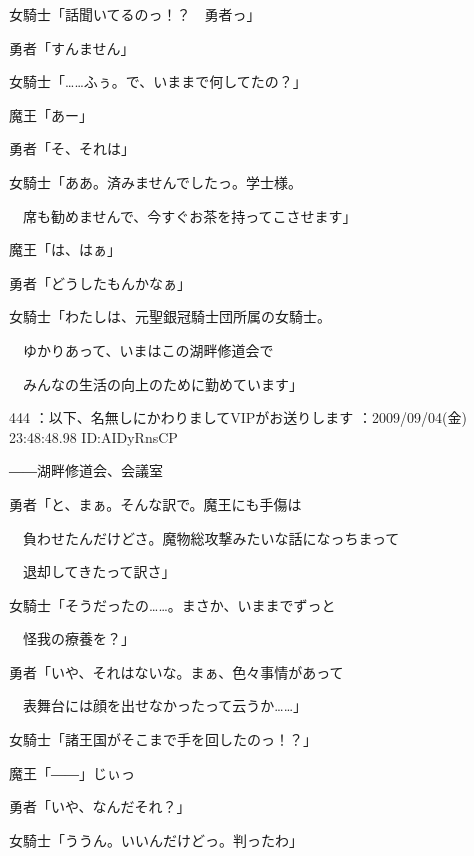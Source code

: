 \documentclass[a4j,twocolumn]{tarticle}
\begin{document}
女騎士「話聞いてるのっ！？　勇者っ」 



勇者「すんません」 



女騎士「……ふぅ。で、いままで何してたの？」 



魔王「あー」\par{} 
勇者「そ、それは」 



女騎士「ああ。済みませんでしたっ。学士様。\par{} 
　席も勧めませんで、今すぐお茶を持ってこさせます」 



魔王「は、はぁ」\par{} 
勇者「どうしたもんかなぁ」 



女騎士「わたしは、元聖銀冠騎士団所属の女騎士。\par{} 
　ゆかりあって、いまはこの湖畔修道会で\par{} 
　みんなの生活の向上のために勤めています」 

	
    
    

444 ：以下、名無しにかわりましてVIPがお送りします ：2009/09/04(金) 23:48:48.98 ID:AIDyRnsCP 


――湖畔修道会、会議室 



勇者「と、まぁ。そんな訳で。魔王にも手傷は\par{} 
　負わせたんだけどさ。魔物総攻撃みたいな話になっちまって\par{} 
　退却してきたって訳さ」 



女騎士「そうだったの……。まさか、いままでずっと\par{} 
　怪我の療養を？」 



勇者「いや、それはないな。まぁ、色々事情があって\par{} 
　表舞台には顔を出せなかったって云うか……」 



女騎士「諸王国がそこまで手を回したのっ！？」 



魔王「――」じぃっ\par{} 
勇者「いや、なんだそれ？」\par{} 
女騎士「ううん。いいんだけどっ。判ったわ」 
\end{document}
